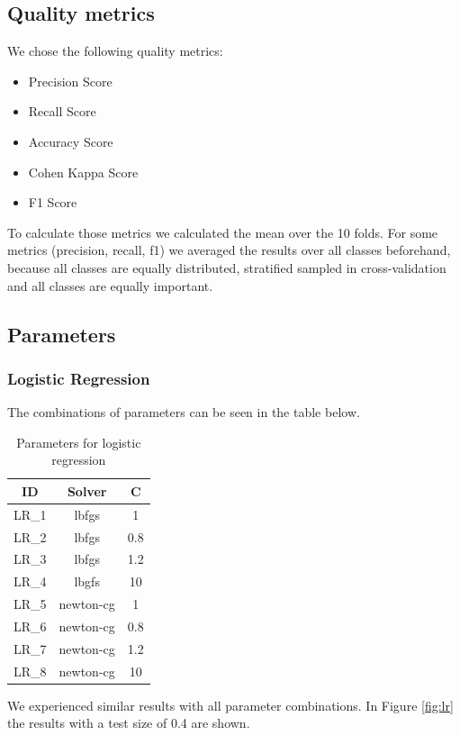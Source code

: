 \documentclass{sig-alternate-05-2015}
\begin{document}
\subsection{Quality metrics}

We chose the following quality metrics:
\begin{itemize}
	\item Precision Score
	\item Recall Score
	\item Accuracy Score
	\item Cohen Kappa Score
	\item F1 Score
\end{itemize}

To calculate those metrics we calculated the mean over the 10 folds.
For some metrics (precision, recall, f1) we averaged the results over all classes beforehand, because all classes are equally distributed, stratified sampled in cross-validation and all classes are equally important.

\subsection{Parameters}

\subsubsection{Logistic Regression}
The combinations of parameters can be seen in the table below.

\begin{table}[h]
\label{tbl:1}
\centering
\caption{Parameters for logistic regression}
\begin{tabular}{c|c|c}
ID & Solver & C \\ 
\hline 
LR\_1 & lbfgs & 1 \\ 
\hline 
LR\_2 & lbfgs & 0.8 \\ 
\hline 
LR\_3 & lbfgs & 1.2 \\ 
\hline 
LR\_4 & lbgfs & 10 \\ 
\hline 
LR\_5 & newton-cg & 1 \\ 
\hline 
LR\_6 & newton-cg & 0.8 \\ 
\hline 
LR\_7 & newton-cg & 1.2 \\ 
\hline 
LR\_8 & newton-cg & 10 \\ 
\end{tabular} 
\end{table}

We experienced similar results with all parameter combinations.
In Figure \ref{fig:lr} the results with a test size of 0.4 are shown.
\end{document}
